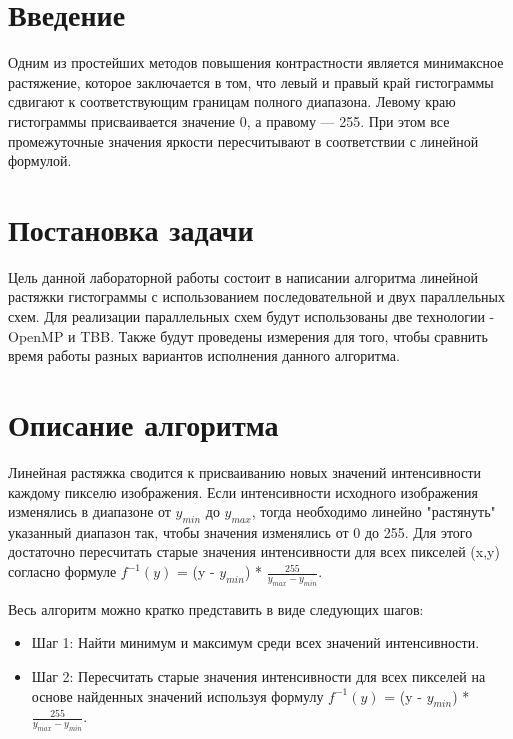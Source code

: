 \documentclass{report}
\begin{document}
\setcounter{page}{2}

\tableofcontents
\newpage

\section*{Введение}
Одним из простейших методов повышения контрастности является минимаксное растяжение, которое заключается в том, что левый и правый край гистограммы сдвигают к соответствующим границам полного диапазона. Левому краю гистограммы присваивается значение 0, а правому — 255. При этом все промежуточные значения яркости пересчитывают в соответствии с линейной формулой.

\newpage

\section*{Постановка задачи}
Цель данной лабораторной работы состоит в написании алгоритма линейной растяжки гистограммы с использованием последовательной и двух параллельных схем. Для реализации параллельных схем будут использованы две технологии - OpenMP и TBB. Также будут проведены измерения для того, чтобы сравнить время работы разных вариантов исполнения данного алгоритма.
\newpage

\section*{Описание алгоритма}
Линейная растяжка сводится к присваиванию новых значений интенсивности каждому пикселю изображения. Если интенсивности исходного изображения изменялись в диапазоне от $y_{min}$ до $y_{max}$, тогда необходимо линейно "растянуть" указанный диапазон так, чтобы значения изменялись от 0 до 255. Для этого достаточно пересчитать старые значения интенсивности для всех пикселей (x,y) согласно формуле $f^{-1}(y)$ = (y - $y_{min}$) * ${\frac{255}{y_{max} - y_{min}}}$.
\par Весь алгоритм можно кратко представить в виде следующих шагов:
\begin{itemize}
\item Шаг 1: Найти минимум и максимум среди всех значений интенсивности.
\item Шаг 2: Пересчитать старые значения интенсивности для всех пикселей на основе найденных значений используя формулу $f^{-1}(y)$ = (y - $y_{min}$) * ${\frac{255}{y_{max} - y_{min}}}$.

\end{itemize}
\newpage
\end{document}

